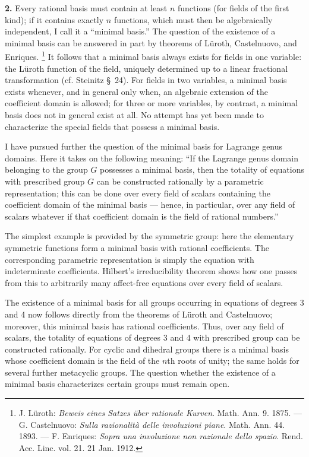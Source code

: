 \documentclass[11pt]{article}
\newcommand{\NoetherSrcNote}[2]{%
  \begingroup
  \renewcommand{\thefootnote}{[#1]}%
  \footnote{#2}%
  \endgroup
}
\begin{document}
\textbf{2.} Every rational basis must contain at least $n$ functions (for fields of the first kind); if it contains exactly $n$ functions, which must then be algebraically independent, I call it a “minimal basis.” The question of the existence of a minimal basis can be answered in part by theorems of Lüroth, Castelnuovo, and Enriques.\NoetherSrcNote{317:1}{J. Lüroth: \emph{Beweis eines Satzes über rationale Kurven}. Math. Ann. 9. 1875. --- G. Castelnuovo: \emph{Sulla razionalità delle involuzioni piane}. Math. Ann. 44. 1893. --- F. Enriques: \emph{Sopra una involuzione non razionale dello spazio}. Rend. Acc. Linc. vol. 21. 21 Jan. 1912.} It follows that a minimal basis always exists for fields in one variable: the Lüroth function of the field, uniquely determined up to a linear fractional transformation (cf. Steinitz \S\ 24). For fields in two variables, a minimal basis exists whenever, and in general only when, an algebraic extension of the coefficient domain is allowed; for three or more variables, by contrast, a minimal basis does not in general exist at all. No attempt has yet been made to characterize the special fields that possess a minimal basis.

I have pursued further the question of the minimal basis for Lagrange genus domains. Here it takes on the following meaning: “If the Lagrange genus domain belonging to the group $G$ possesses a minimal basis, then the totality of equations with prescribed group $G$ can be constructed rationally by a parametric representation; this can be done over every field of scalars containing the coefficient domain of the minimal basis --- hence, in particular, over any field of scalars whatever if that coefficient domain is the field of rational numbers.”

The simplest example is provided by the symmetric group: here the elementary symmetric functions form a minimal basis with rational coefficients. The corresponding parametric representation is simply the equation with indeterminate coefficients. Hilbert's irreducibility theorem shows how one passes from this to arbitrarily many affect-free equations over every field of scalars.

The existence of a minimal basis for all groups occurring in equations of degrees 3 and 4 now follows directly from the theorems of Lüroth and Castelnuovo; moreover, this minimal basis has rational coefficients. Thus, over any field of scalars, the totality of equations of degrees 3 and 4 with prescribed group can be constructed rationally. For cyclic and dihedral groups there is a minimal basis whose coefficient domain is the field of the $n$th roots of unity; the same holds for several further metacyclic groups. The question whether the existence of a minimal basis characterizes certain groups must remain open.
\end{document}
